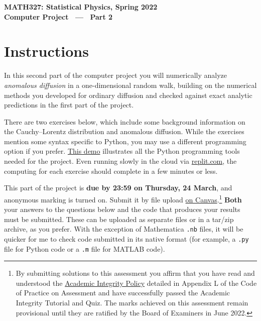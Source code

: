 \documentclass[12 pt]{article} %
\begin{document}
\newcommand{\thisunit}{MATH327 Project Part 2}
\newcommand{\moddate}{Last modified 10 Mar.~2022}
\begin{center}
  {\Large \textbf{MATH327: Statistical Physics, Spring 2022}} \\[12 pt]
  {\Large \textbf{Computer Project \ --- \ Part 2}} \\[24 pt]
\end{center}

\section*{Instructions}
In this second part of the computer project you will numerically analyze \textit{anomalous diffusion} in a one-dimensional random walk, building on the numerical methods you developed for ordinary diffusion and checked against exact analytic predictions in the first part of the project.

There are two exercises below, which include some background information on the Cauchy--Lorentz distribution and anomalous diffusion.
While the exercises mention some syntax specific to Python, you may use a different programming option if you prefer.
\href{https://tinyurl.com/math327demo}{This demo} illustrates all the Python programming tools needed for the project.
Even running slowly in the cloud via \href{https://replit.com/languages/python3}{replit.com}, the computing for each exercise should complete in a few minutes or less.

This part of the project is \textbf{due by 23:59 on Thursday, 24 March}, and anonymous marking is turned on.
Submit it by file upload \href{https://liverpool.instructure.com/courses/47333/assignments/178543}{on Canvas}.\footnote{By submitting solutions to this assessment you affirm that you have read and understood the \href{https://www.liverpool.ac.uk/media/livacuk/tqsd/code-of-practice-on-assessment/appendix_L_cop_assess.pdf}{Academic Integrity Policy} detailed in Appendix L of the Code of Practice on Assessment and have successfully passed the Academic Integrity Tutorial and Quiz.  The marks achieved on this assessment remain provisional until they are ratified by the Board of Examiners in June 2022.}
\textbf{Both} your answers to the questions below and the code that produces your results must be submitted.
These can be uploaded as separate files or in a tar/zip archive, as you prefer.
With the exception of Mathematica \texttt{.nb} files, it will be quicker for me to check code submitted in its native format (for example, a \texttt{.py} file for Python code or a \texttt{.m} file for MATLAB code).
\end{document}
